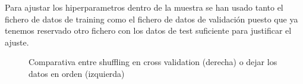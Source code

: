 \documentclass{article}
\begin{document}
Para ajustar los hiperparametros dentro de la muestra se han usado tanto el fichero de datos de training como el fichero de datos de validación puesto que ya tenemos reservado otro fichero con los datos de test suficiente para justificar el ajuste.

\newpage

\begin{figure}[H]
\centering
    \caption{Comparativa entre shuffling en cross validation (derecha) o dejar los datos en orden (izquierda)}
\end{figure}
\end{document}

